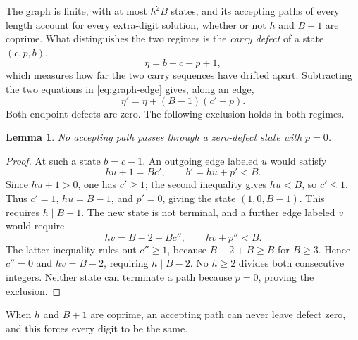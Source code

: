 \documentclass[11pt]{amsart}
\newtheorem{lemma}[theorem]{Lemma}
\theoremstyle{remark}\newtheorem{remark}[theorem]{Remark}
\begin{document}
The graph is finite, with at most $h^2B$ states, and its accepting paths of every length account for every extra-digit solution, whether or not $h$ and $B+1$ are coprime. What distinguishes the two regimes is the \emph{carry defect} of a state $(c,p,b)$,
\[
 \eta=b-c-p+1,
\]
which measures how far the two carry sequences have drifted apart. Subtracting the two equations in \eqref{eq:graph-edge} gives, along an edge,
\begin{equation}\label{eq:defect-transition}
 \eta'=\eta+(B-1)(c'-p).
\end{equation}
Both endpoint defects are zero. The following exclusion holds in both regimes.

\begin{lemma}\label{lem:dead-branch}
No accepting path passes through a zero-defect state with $p=0$.
\end{lemma}
\begin{proof}
At such a state $b=c-1$. An outgoing edge labeled $u$ would satisfy
\[
 hu+1=Bc',\qquad b'=hu+p'<B.
\]
Since $hu+1>0$, one has $c'\ge1$; the second inequality gives $hu<B$, so $c'\le1$. Thus $c'=1$, $hu=B-1$, and $p'=0$, giving the state $(1,0,B-1)$. This requires $h\mid B-1$. The new state is not terminal, and a further edge labeled $v$ would require
\[
 hv=B-2+Bc'',\qquad hv+p''<B.
\]
The latter inequality rules out $c''\ge1$, because $B-2+B\ge B$ for $B\ge3$. Hence $c''=0$ and $hv=B-2$, requiring $h\mid B-2$. No $h\ge2$ divides both consecutive integers. Neither state can terminate a path because $p=0$, proving the exclusion.
\end{proof}

When $h$ and $B+1$ are coprime, an accepting path can never leave defect zero, and this forces every digit to be the same.
\end{document}
